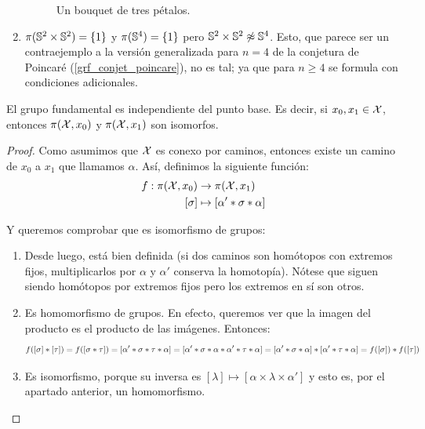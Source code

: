 \begin{exa}
\begin{enumerate}
\begin{figure}[h!]
			\caption{Un bouquet de tres pétalos.}
		\end{figure}
	
		\item $\pi(\mathbb{S}^2\times\mathbb{S}^2)=\{1\}$ y $\pi(\mathbb{S}^4)=\{1\}$ pero $\Sfe^2\times\Sfe^2\centernot\homeo\Sfe^4$. Esto, que parece ser un contraejemplo a la versión generalizada para $n=4$ de la conjetura de Poincaré (\ref{grf_conjet_poincare}), no es tal; ya que para $n\geq 4$ se formula con condiciones adicionales. \qedhere
	\end{enumerate}
\end{exa}

\begin{prop}
	El grupo fundamental es independiente del punto base. Es decir, si $x_0,x_1\in\mathcal{X}$, entonces $\pi(\mathcal{X},x_0)$ y $\pi(\mathcal{X},x_1)$ son isomorfos.
	
	\begin{proof}
		Como asumimos que $\mathcal{X}$ es conexo por caminos, entonces existe un camino de $x_0$ a $x_1$ que llamamos $\alpha$. Así, definimos la siguiente función:
		\[\begin{split}
		f:\pi(\mathcal{X},x_0) &\to \pi(\mathcal{X},x_1) \\
		[\sigma]&\mapsto [\alpha'\mathbin{*}\sigma\mathbin{*}\alpha]
		\end{split}\]
		
		Y queremos comprobar que es isomorfismo de grupos:
		\begin{enumerate}
			\item Desde luego, está bien definida (si dos caminos son homótopos con extremos fijos, multiplicarlos por $\alpha$ y $\alpha'$ conserva la homotopía). Nótese que siguen siendo homótopos por extremos fijos pero los extremos en sí son otros.
			
			\item Es homomorfismo de grupos. En efecto, queremos ver que la imagen del producto es el producto de las imágenes. Entonces:
			\[f([\sigma]\mathbin{*}[\tau]) = f([\sigma\mathbin{*}\tau])=[\alpha'\mathbin{*}\sigma\mathbin{*}\tau\mathbin{*}\alpha]=[\alpha'\mathbin{*}\sigma\mathbin{*}\alpha\mathbin{*}\alpha'\mathbin{*}\tau\mathbin{*}\alpha] = [\alpha'\mathbin{*}\sigma\mathbin{*}\alpha]\mathbin{*}[\alpha'\mathbin{*}\tau\mathbin{*}\alpha]=f([\sigma])\mathbin{*} f([\tau])\]
			
			\item Es isomorfismo, porque su inversa es $[\lambda]\mapsto[\alpha\times\lambda\times\alpha']$ y esto es, por el apartado anterior, un homomorfismo. \qedhere
		\end{enumerate}
	\end{proof}
\end{prop}

